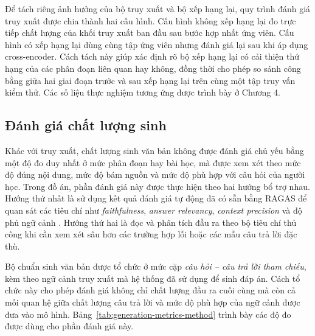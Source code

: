 \documentclass[../DoAn.tex]{subfiles}
\begin{document}
Để tách riêng ảnh hưởng của bộ truy xuất và bộ xếp hạng lại, quy trình đánh giá truy xuất được chia thành hai cấu hình. Cấu hình không xếp hạng lại đo trực tiếp chất lượng của khối truy xuất ban đầu sau bước hợp nhất ứng viên. Cấu hình có xếp hạng lại dùng cùng tập ứng viên nhưng đánh giá lại sau khi áp dụng cross-encoder. Cách tách này giúp xác định rõ bộ xếp hạng lại có cải thiện thứ hạng của các phân đoạn liên quan hay không, đồng thời cho phép so sánh công bằng giữa hai giai đoạn trước và sau xếp hạng lại trên cùng một tập truy vấn kiểm thử. Các số liệu thực nghiệm tương ứng được trình bày ở Chương 4.

\subsection{Đánh giá chất lượng sinh}

Khác với truy xuất, chất lượng sinh văn bản không được đánh giá chủ yếu bằng một độ đo duy nhất ở mức phân đoạn hay bài học, mà được xem xét theo mức độ đúng nội dung, mức độ bám nguồn và mức độ phù hợp với câu hỏi của người học. Trong đồ án, phần đánh giá này được thực hiện theo hai hướng bổ trợ nhau. Hướng thứ nhất là sử dụng kết quả đánh giá tự động đã có sẵn bằng RAGAS để quan sát các tiêu chí như \textit{faithfulness}, \textit{answer relevancy}, \textit{context precision} và độ phủ ngữ cảnh \cite{es2023ragas}. Hướng thứ hai là đọc và phân tích đầu ra theo bộ tiêu chí thủ công khi cần xem xét sâu hơn các trường hợp lỗi hoặc các mẫu câu trả lời đặc thù.

Bộ chuẩn sinh văn bản được tổ chức ở mức cặp \textit{câu hỏi -- câu trả lời tham chiếu}, kèm theo ngữ cảnh truy xuất mà hệ thống đã sử dụng để sinh đáp án. Cách tổ chức này cho phép đánh giá không chỉ chất lượng đầu ra cuối cùng mà còn cả mối quan hệ giữa chất lượng câu trả lời và mức độ phù hợp của ngữ cảnh được đưa vào mô hình. Bảng~\ref{tab:generation-metrics-method} trình bày các độ đo được dùng cho phần đánh giá này.
\end{document}
